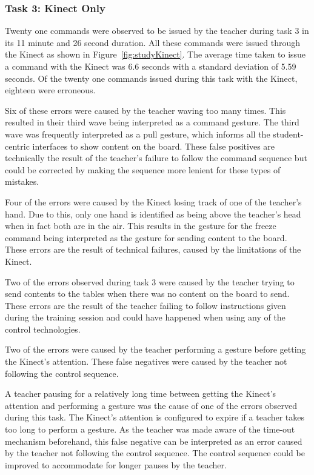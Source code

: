 \documentclass[link]{IWCOMP}
\begin{document}
\subsubsection{Task 3: Kinect Only}
\label{subsubsec:pilotStudyResultsTask3}

Twenty one commands were observed to be issued by the teacher during task 3 in its 11 minute and 26 second duration.
All these commands were issued through the Kinect as shown in Figure~\ref{fig:studyKinect}.
The average time taken to issue a command with the Kinect was 6.6 seconds with a standard deviation of 5.59 seconds.
Of the twenty one commands issued during this task with the Kinect, eighteen were erroneous.

Six of these errors were caused by the teacher waving too many times.
This resulted in their third wave being interpreted as a command gesture.
The third wave was frequently interpreted as a pull gesture, which informs all the student-centric interfaces to show content on the board.
These false positives are technically the result of the teacher's failure to follow the command sequence but could be corrected by making the sequence more lenient for these types of mistakes.

Four of the errors were caused by the Kinect losing track of one of the teacher's hand.
Due to this, only one hand is identified as being above the teacher's head when in fact both are in the air.
This results in the gesture for the freeze command being interpreted as the gesture for sending content to the board.
These errors are the result of technical failures, caused by the limitations of the Kinect.

Two of the errors observed during task 3 were caused by the teacher trying to send contents to the tables when there was no content on the board to send.
These errors are the result of the teacher failing to follow instructions given during the training session and could have happened when using any of the control technologies.

Two of the errors were caused by the teacher performing a gesture before getting the Kinect's attention.
These false negatives were caused by the teacher not following the control sequence.

A teacher pausing for a relatively long time between getting the Kinect's attention and performing a gesture was the cause of one of the errors observed during this task.
The Kinect's attention is configured to expire if a teacher takes too long to perform a gesture.
As the teacher was made aware of the time-out mechanism beforehand, this false negative can be interpreted as an error caused by the teacher not following the control sequence.
The control sequence could be improved to accommodate for longer pauses by the teacher.
\end{document}
